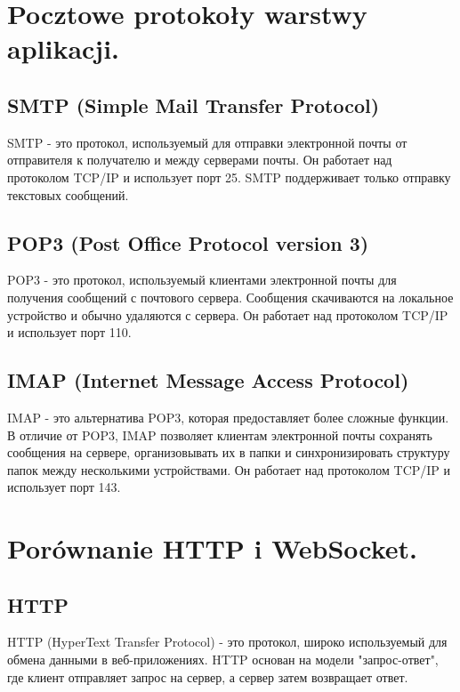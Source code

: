 \section{Pocztowe protokoły warstwy aplikacji. }

\subsection*{SMTP (Simple Mail Transfer Protocol)}

SMTP - это протокол, используемый для отправки электронной почты от отправителя к получателю и между серверами почты. Он работает над протоколом TCP/IP и использует порт 25. SMTP поддерживает только отправку текстовых сообщений.

\subsection*{POP3 (Post Office Protocol version 3)}

POP3 - это протокол, используемый клиентами электронной почты для получения сообщений с почтового сервера. Сообщения скачиваются на локальное устройство и обычно удаляются с сервера. Он работает над протоколом TCP/IP и использует порт 110.

\subsection*{IMAP (Internet Message Access Protocol)}

IMAP - это альтернатива POP3, которая предоставляет более сложные функции. В отличие от POP3, IMAP позволяет клиентам электронной почты сохранять сообщения на сервере, организовывать их в папки и синхронизировать структуру папок между несколькими устройствами. Он работает над протоколом TCP/IP и использует порт 143.


\section{Porównanie HTTP i WebSocket. }

\subsection*{HTTP}

HTTP (HyperText Transfer Protocol) - это протокол, широко используемый для обмена данными в веб-приложениях. HTTP основан на модели "запрос-ответ", где клиент отправляет запрос на сервер, а сервер затем возвращает ответ. 

